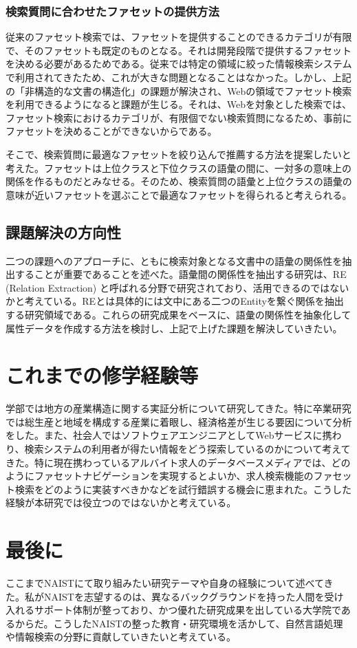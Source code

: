 \documentclass[a4j,10pt, twocolumn]{jarticle} \usepackage[dvipdfmx]{graphicx} \usepackage{amssymb} \usepackage{amsmath}
\begin{document}
\subsubsection{検索質問に合わせたファセットの提供方法}
従来のファセット検索では、ファセットを提供することのできるカテゴリが有限で、そのファセットも既定のものとなる。それは開発段階で提供するファセットを決める必要があるためである。従来では特定の領域に絞った情報検索システムで利用されてきたため、これが大きな問題となることはなかった。しかし、上記の「非構造的な文書の構造化」の課題が解決され、Webの領域でファセット検索を利用できるようになると課題が生じる。それは、Webを対象とした検索では、ファセット検索におけるカテゴリが、有限個でない検索質問になるため、事前にファセットを決めることができないからである。

そこで、検索質問に最適なファセットを絞り込んで推薦する方法を提案したいと考えた。ファセットは上位クラスと下位クラスの語彙の間に、一対多の意味上の関係を作るものだとみなせる。そのため、検索質問の語彙と上位クラスの語彙の意味が近いファセットを選ぶことで最適なファセットを得られると考えられる。

\subsection{課題解決の方向性}
二つの課題へのアプローチに、ともに検索対象となる文書中の語彙の関係性を抽出することが重要であることを述べた。語彙間の関係性を抽出する研究は、RE (Relation Extraction) と呼ばれる分野で研究されており、活用できるのではないかと考えている。REとは具体的には文中にある二つのEntityを繋ぐ関係を抽出する研究領域である。これらの研究成果をベースに、語彙の関係性を抽象化して属性データを作成する方法を検討し、上記で上げた課題を解決していきたい。

\section{これまでの修学経験等}
 学部では地方の産業構造に関する実証分析について研究してきた。特に卒業研究では総生産と地域を構成する産業に着眼し、経済格差が生じる要因について分析をした。また、社会人ではソフトウェアエンジニアとしてWebサービスに携わり、検索システムの利用者が得たい情報をどう探索しているのかについて考えてきた。特に現在携わっているアルバイト求人のデータベースメディアでは、どのようにファセットナビゲーションを実現するとよいか、求人検索機能のファセット検索をどのように実装すべきかなどを試行錯誤する機会に恵まれた。こうした経験が本研究では役立つのではないかと考えている。

\section{最後に}
ここまでNAISTにて取り組みたい研究テーマや自身の経験について述べてきた。私がNAISTを志望するのは、異なるバックグラウンドを持った人間を受け入れるサポート体制が整っており、かつ優れた研究成果を出している大学院であるからだ。こうしたNAISTの整った教育・研究環境を活かして、自然言語処理や情報検索の分野に貢献していきたいと考えている。
\end{document}
